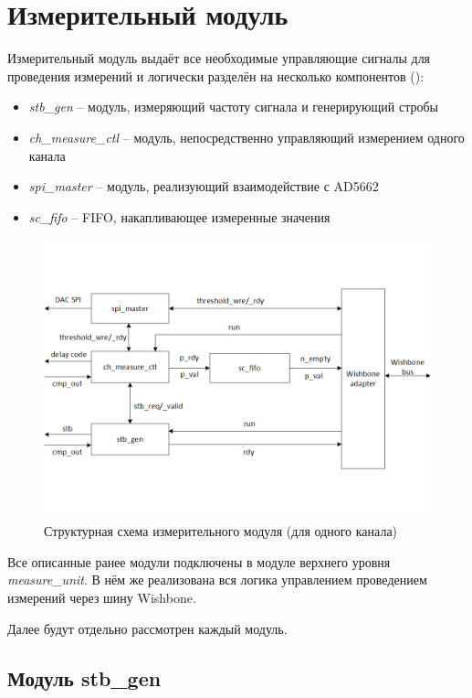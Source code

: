 \section{Измерительный модуль}

Измерительный модуль выдаёт все необходимые управляющие сигналы для проведения измерений и логически разделён на несколько компонентов ():

\begin{itemize}
	\item \emph{stb\_gen} -- модуль, измеряющий частоту сигнала и генерирующий стробы
	\item \emph{ch\_measure\_ctl} -- модуль, непосредственно управляющий измерением одного канала
	\item \emph{spi\_master} -- модуль, реализующий взаимодействие с AD5662
	\item \emph{sc\_fifo} -- FIFO, накапливающее измеренные значения
\end{itemize}

\begin{figure}[ht!] 
	\center
	\includegraphics [scale=0.7] {my_folder/images//mu_struct}
	\caption{Структурная схема измерительного модуля (для одного канала)} 
	\label{fig:mu-struct}  
\end{figure}

Все описанные ранее модули подключены в модуле верхнего уровня \emph{measure\_unit}. В нём же
реализована вся логика управлением проведением измерений через шину Wishbone.

Далее будут отдельно рассмотрен каждый модуль.

\subsection{Модуль stb\_gen}




\newpage